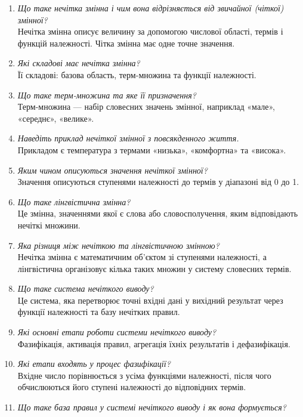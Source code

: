 \documentclass[12pt,a4paper]{article}
\begin{document}
\begin{enumerate}[leftmargin=*]
  \item \textit{Що таке нечітка змінна і чим вона відрізняється від звичайної (чіткої) змінної?}\\
  Нечітка змінна описує величину за допомогою числової області, термів і функцій належності. Чітка змінна має одне точне значення.
  \item \textit{Які складові має нечітка змінна?}\\
  Її складові: базова область, терм-множина та функції належності.
  \item \textit{Що таке терм-множина та яке її призначення?}\\
  Терм-множина --- набір словесних значень змінної, наприклад «мале», «середнє», «велике».
  \item \textit{Наведіть приклад нечіткої змінної з повсякденного життя.}\\
  Прикладом є температура з термами «низька», «комфортна» та «висока».
  \item \textit{Яким чином описуються значення нечіткої змінної?}\\
  Значення описуються ступенями належності до термів у діапазоні від 0 до 1.
  \item \textit{Що таке лінгвістична змінна?}\\
  Це змінна, значеннями якої є слова або словосполучення, яким відповідають нечіткі множини.
  \item \textit{Яка різниця між нечіткою та лінгвістичною змінною?}\\
  Нечітка змінна є математичним об'єктом зі ступенями належності, а лінгвістична організовує кілька таких множин у систему словесних термів.
  \item \textit{Що таке система нечіткого виводу?}\\
  Це система, яка перетворює точні вхідні дані у вихідний результат через функції належності та базу нечітких правил.
  \item \textit{Які основні етапи роботи системи нечіткого виводу?}\\
  Фазифікація, активація правил, агрегація їхніх результатів і дефазифікація.
  \item \textit{Які етапи входять у процес фазифікації?}\\
  Вхідне число порівнюється з усіма функціями належності, після чого обчислюються його ступені належності до відповідних термів.
  \item \textit{Що таке база правил у системі нечіткого виводу і як вона формується?}\\

\end{enumerate}
\end{document}
